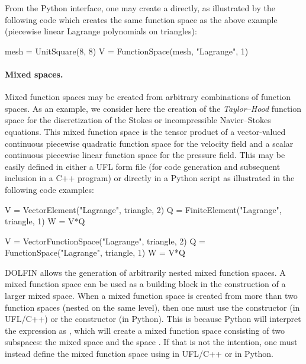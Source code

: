 From the Python interface, one may create a 
directly, as illustrated by the following code which creates the same
function space as the above example (piecewise linear Lagrange
polynomials on triangles):

\begin{python}
mesh = UnitSquare(8, 8)
V = FunctionSpace(mesh, "Lagrange", 1)
\end{python}

\paragraph{Mixed spaces.}

Mixed function spaces may be created from arbitrary combinations of
function spaces. As an example, we consider here the creation of the
\emph{Taylor--Hood} function space for the discretization of the
Stokes or incompressible Navier--Stokes equations. This mixed function
space is the tensor product of a vector-valued continuous piecewise
quadratic function space for the velocity field and a scalar
continuous piecewise linear function space for the pressure
field. This may be easily defined in either a UFL form file (for code
generation and subsequent inclusion in a C++ program) or directly in a
Python script as illustrated in the following code examples:
\begin{uflcode}
V = VectorElement("Lagrange", triangle, 2)
Q = FiniteElement("Lagrange", triangle, 1)
W = V*Q
\end{uflcode}
\begin{python}
V = VectorFunctionSpace("Lagrange", triangle, 2)
Q = FunctionSpace("Lagrange", triangle, 1)
W = V*Q
\end{python}

DOLFIN allows the generation of arbitrarily nested mixed function
spaces. A mixed function space can be used as a building block in the
construction of a larger mixed space. When a mixed function space is
created from more than two function spaces (nested on the same level),
then one must use the  constructor (in UFL/C++) or
the  constructor (in Python). This is because
Python will interpret the expression  as ,
which will create a mixed function space consisting of two subspaces:
the mixed space  and the space . If that is not the
intention, one must instead define the mixed function space using
 in UFL/C++ or
 in Python.

